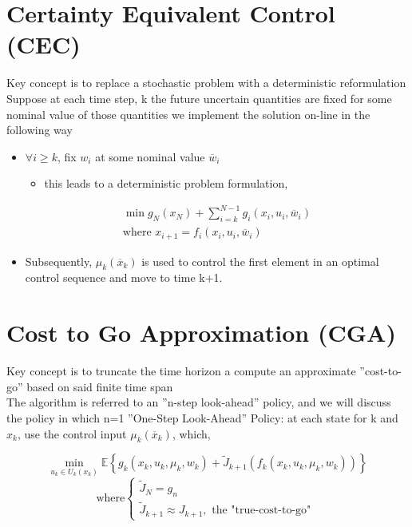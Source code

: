 \documentclass[twoside]{article}
\begin{document}
\section{Certainty Equivalent Control (CEC)}
Key concept is to replace a stochastic problem with a deterministic reformulation\\
Suppose at each time step, k the future uncertain quantities are fixed for some nominal value of those quantities we implement the solution on-line in the following way
\begin{itemize}
    \item $\forall i \geq k$, fix $w_{i}$ at some nominal value $\overline{w}_{i}$
    \begin{itemize}
    \item this leads to a deterministic problem formulation,
    \end{itemize}
$$ 
\begin{array}{c}{\min g_{N}\left(x_{N}\right)+\sum_{i=k}^{N-1} g_{i}\left(x_{i}, u_{i}, \overline{w}_{i}\right)} \\ {\text{where }   x_{i+1}=f_{i}\left(x_{i}, u_{i}, \overline{w}_{i}\right)}\end{array}
 $$

    \item Subsequently, $\mu_{k}\left(\overline{x}_{k}\right)$ is used to control the first element in an optimal control sequence and move to time k+1.
 
\end{itemize}

\section{Cost to Go Approximation (CGA)}
Key concept is to truncate the time horizon a compute an approximate ”cost-to-go” based on said finite time span\\
The algorithm is referred to an ”n-step look-ahead” policy, and we will discuss the policy in which n=1 ”One-Step Look-Ahead” Policy: at each state for k and $x_k$, use the control input $\mu_k(\overline{x}_k)$, which,

$$ 
\min _{u_{k} \in U_{k}\left(x_{k}\right)} \mathbb{E}\left\{g_{k}\left(x_{k}, u_{k}, \mu_{k}, w_{k}\right)+\tilde{J}_{k+1}\left(f_{k}\left(x_{k}, u_{k}, \mu_{k}, w_{k}\right)\right)\right\}
 $$
$$ 
\text{where} \left\{\begin{array}{c}{\tilde{J}_{N}=g_{n}} \\ {\tilde{J}_{k+1} \approx J_{k+1}, \text { the "true-cost-to-go" }}\end{array}\right.
 $$
 
\end{document}
